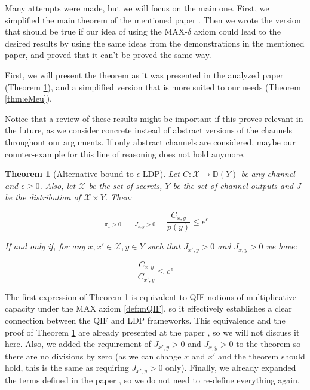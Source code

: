 \documentclass[conference]{IEEEtran}
\newtheorem{theorem}{Theorem}
\newcommand{\X}{\mathcal{X}}
\newcommand{\D}{\mathbb{D}}
\newcommand{\DX}{\mathbb{D}(\mathcal{X})}
\begin{document}
Many attempts were made, but we will focus on the main one. First, we simplified the main theorem of the mentioned paper \cite{fernandes2024explaining}. Then we wrote the version that should be true if our idea of using the MAX-$\delta$ axiom could lead to the desired results by using the same ideas from the demonstrations in the mentioned paper, and proved that it can't be proved the same way.

First, we will present the theorem as it was presented in the analyzed paper \cite{fernandes2024explaining} (Theorem \ref{thm:ePaper}), and a simplified version that is more suited to our needs (Theorem \ref{thm:eMeu}).

Notice that a review of these results might be important if this proves relevant in the future, as we consider concrete instead of abstract versions of the channels throughout our arguments. If only abstract channels are considered, maybe our counter-example for this line of reasoning does not hold anymore.

\begin{theorem}[Alternative bound to $\epsilon$-LDP]\label{thm:ePaper} Let $C: \X \rightarrow \D(Y)$ be any channel and $\epsilon \geq 0$. Also, let $\X$ be the set of secrets, $Y$ be the set of channel outputs and $J$ be the distribution of $\X \times Y$. Then:

$$\mathop{\sup_{\pi\in\DX:}}_{\pi_x>0}\quad\mathop{\max_{x\in\X,y\in Y:}}_{ J_{x,y}>0}\quad\frac{C_{x,y}}{p(y)} \leq e^\epsilon $$

If and only if, for any $x,x' \in \X, y \in Y$ such that $J_{x',y} > 0$ and $J_{x,y} > 0$ we have:

$$\frac{C_{x,y}}{C_{x',y}} \leq e^\epsilon$$

\end{theorem}

The first expression of Theorem \ref{thm:ePaper} is equivalent to QIF notions of multiplicative capacity under the MAX axiom \ref{def:mQIF}, so it effectively establishes a clear connection between the QIF and LDP frameworks. This equivalence and the proof of Theorem \ref{thm:ePaper} are already presented at the paper \cite{fernandes2024explaining}, so we will not discuss it here. Also, we added the requirement of $J_{x',y} > 0$ and $J_{x,y} > 0$ to the theorem so there are no divisions by zero (as we can change $x$ and $x'$ and the theorem should hold, this is the same as requiring $J_{x',y} > 0$ only). Finally, we already expanded the terms defined in the paper \cite{fernandes2024explaining}, so we do not need to re-define everything again.
\end{document}
